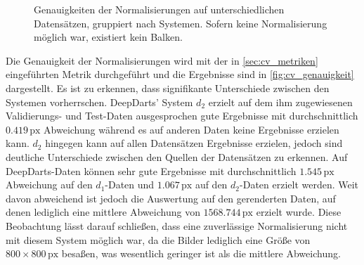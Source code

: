 \begin{figure}
    \centering
    \caption{Genauigkeiten der Normalisierungen auf unterschiedlichen Datensätzen, gruppiert nach Systemen. Sofern keine Normalisierung möglich war, existiert kein Balken.}
    \label{fig:cv_genauigkeit}
\end{figure}

Die Genauigkeit der Normalisierungen wird mit der in \autoref{sec:cv_metriken} eingeführten Metrik durchgeführt und die Ergebnisse sind in \autoref{fig:cv_genauigkeit} dargestellt. Es ist zu erkennen, dass signifikante Unterschiede zwischen den Systemen vorherrschen. DeepDarts' System $d_2$ erzielt auf dem ihm zugewiesenen Validierungs- und Test-Daten ausgesprochen gute Ergebnisse mit durchschnittlich $0.419\,\text{px}$ Abweichung während es auf anderen Daten keine Ergebnisse erzielen kann. $d_2$ hingegen kann auf allen Datensätzen Ergebnisse erzielen, jedoch sind deutliche Unterschiede zwischen den Quellen der Datensätzen zu erkennen. Auf DeepDarts-Daten können sehr gute Ergebnisse mit durchschnittlich $1.545\,\text{px}$ Abweichung auf den $d_1$-Daten und $1.067\,\text{px}$ auf den $d_2$-Daten erzielt werden. Weit davon abweichend ist jedoch die Auswertung auf den gerenderten Daten, auf denen lediglich eine mittlere Abweichung von $1568.744\,\text{px}$ erzielt wurde.
Diese Beobachtung lässt darauf schließen, dass eine zuverlässige Normalisierung nicht mit diesem System möglich war, da die Bilder lediglich eine Größe von $800 \times 800\,\text{px}$ besaßen, was wesentlich geringer ist als die mittlere Abweichung.


